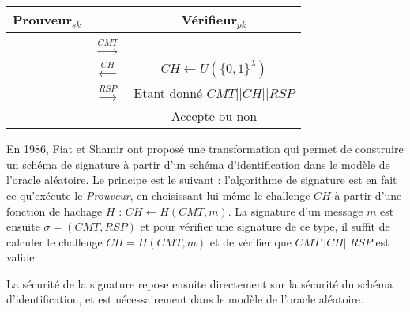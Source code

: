 \begin{center}
\begin{tabular}{c  c  c}
 Prouveur$_{sk}$ & &  Vérifieur$_{pk}$ \\
\hline \\
& $\overset{CMT}{\rightarrow}$ & \\
& $\overset{CH}{\leftarrow}$ & $CH \leftarrow U(\{0,1\}^{\lambda})$ \\
& $\overset{RSP}{\rightarrow}$ & Etant donné $ CMT || CH || RSP$ \\
&  & Accepte ou non \\
\hline
\end{tabular} \end{center}

\bigskip

En 1986, Fiat et Shamir ont proposé une transformation qui permet de construire un schéma de signature à partir d'un schéma d'identification dans le modèle de l'oracle aléatoire. Le principe est le suivant : l'algorithme de signature est en fait ce qu'exécute le \emph{Prouveur}, en choisissant lui même le challenge $CH$ à partir d'une fonction de hachage $H$ : $CH \leftarrow H(CMT,m)$. La signature d'un message $m$ est ensuite $\sigma = (CMT, RSP)$ et pour vérifier une signature de ce type, il suffit de calculer le challenge $CH = H(CMT,m)$ et de vérifier que $ CMT || CH || RSP$ est valide.

La sécurité de la signature repose ensuite directement sur la sécurité du schéma d'identification, et est nécessairement dans le modèle de l'oracle aléatoire. %



